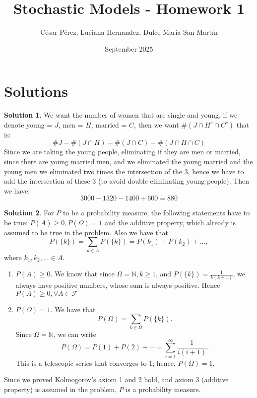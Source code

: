 \documentclass{article}
\title{Stochastic Models - Homework 1}
\author{César Pérez, Luciana Hernandez, Dulce María San Martín}
\date{September 2025}
\begin{document}
\theoremstyle{definition}
\newtheorem{solutions}{Solution}
\maketitle

\section*{Solutions}
    \begin{minipage}{\linewidth}
        \begin{solutions}
            We want the number of women that are single and young, if we denote young = $J$, men = $H$, married = $C$, then we want $\#(J \cap H^{c} \cap C^c)$ that is:
            \[
                \#J - \#(J \cap H) - \#(J \cap C) + \#(J \cap H \cap C)
            \]
            Since we are taking the young people, eliminating if they are men or married, since there are young married men, and we eliminated the young married and the young men we eliminated two times the intersection of the 3, hence we have to add the intersection of these 3 (to avoid double eliminating young people). Then we have:
            \[
                3000 - 1320 - 1400 + 600 = 880
            \]
        \end{solutions}
        \medskip
    \end{minipage}
    \begin{minipage}{\linewidth}
        \begin{solutions}
            For $P$ to be a probability measure, the following statements have to be true: $P(A) \geq 0, P(\Omega) = 1$ and the additive property, which already is assumed to be true in the problem.
            Also we have that 
            \[
                P(\{k\}) = \sum_{k \in A}P(\{k\}) = P(k_1) + P(k_2) + ..., 
            \]
            where $k_1, k_2, ... \in A$.
                \begin{enumerate}
                    \item $P(A) \geq 0$. We know that since $\Omega = \mathbb{N}, k \geq 1$, and $P(\{k\}) = \frac{1}{k(k+1)}$, we always have positive numbers, whose sum is always positive. Hence $P(A) \geq 0, \forall A \in \mathcal{F}$
                    \item $P(\Omega) = 1$.
                    We have that 
                    \[
                        P(\Omega) = \sum_{k \in \Omega} P(\{k\}).
                    \]
                    Since $\Omega = \mathbb{N}$, we can write 
                    \[
                        P(\Omega) = P(1) + P(2) + \cdots 
                        = \sum_{i = 1}^{\infty} \frac{1}{i(i + 1)}.
                    \]
                    This is a telescopic series that converges to $1$; hence, $P(\Omega) = 1$.
                \end{enumerate}
            Since we proved Kolmogorov's axiom 1 and 2 hold, and axiom 3 (additive property) is assumed in the problem, $P$ is a probability measure. 
        \end{solutions}
    \end{minipage}
\end{document}
